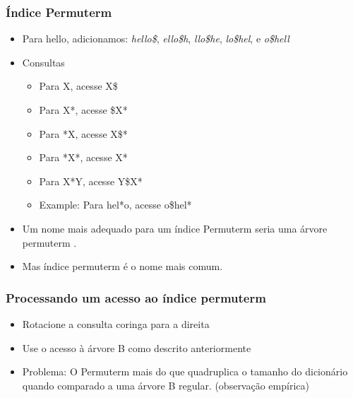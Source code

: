 \documentclass[compress]{beamer}
\def\term#1{{\sc #1}}   %
\begin{document}
\begin{frame}
\frametitle{Índice Permuterm }
\begin{itemize}[<+->]
\item Para \term{hello}, adicionamos:
\emph{hello\$},
\emph{ello\$h},
\emph{llo\$he},
\emph{lo\$hel}, e
\emph{o\$hell}
\item Consultas
\begin{itemize}[<+->]
\item Para X, acesse X\$
\item Para X*, acesse \$X*
\item Para *X, acesse X\$*
\item Para *X*, acesse X*
\item Para X*Y, acesse Y\$X*
\item Example: Para hel*o, acesse o\$hel*
\end{itemize}
\item Um nome mais adequado para um índice Permuterm  seria uma árvore 
permuterm .
\item Mas índice permuterm é o nome mais comum.
\end{itemize}
\end{frame}

\begin{frame}
\frametitle{Processando um acesso ao índice permuterm }
\begin{itemize}[<+->]
\item Rotacione a consulta coringa para a direita
\item Use o acesso à árvore B como descrito anteriormente
\item Problema: O Permuterm mais do que {\color{blue} quadruplica} 
o tamanho do dicionário quando comparado a uma árvore B regular. 
(observação empírica)
\end{itemize}
\end{frame}
\end{document}
